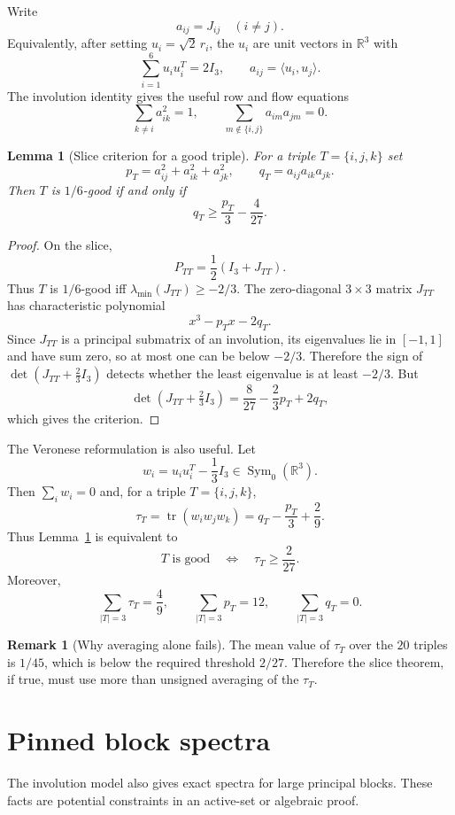 \documentclass[11pt]{article}
\numberwithin{equation}{section}
\newtheorem{lemma}[theorem]{Lemma}
\theoremstyle{definition}
\newtheorem{remark}[theorem]{Remark}
\newcommand{\R}{\mathbb{R}}
\newcommand{\tr}{\operatorname{tr}}
\newcommand{\lmin}{\lambda_{\min}}
\begin{document}
Write
\[
  a_{ij}=J_{ij}\quad (i\ne j).
\]
Equivalently, after setting $u_i=\sqrt2\,r_i$, the $u_i$ are unit vectors in
$\R^3$ with
\[
  \sum_{i=1}^6 u_i u_i^T=2I_3,\qquad a_{ij}=\langle u_i,u_j\rangle.
\]
The involution identity gives the useful row and flow equations
\[
  \sum_{k\ne i}a_{ik}^2=1,\qquad
  \sum_{m\notin\{i,j\}}a_{im}a_{jm}=0.
\]

\begin{lemma}[Slice criterion for a good triple]\label{lem:slicecriterion}
For a triple $T=\{i,j,k\}$ set
\[
  p_T=a_{ij}^2+a_{ik}^2+a_{jk}^2,\qquad q_T=a_{ij}a_{ik}a_{jk}.
\]
Then $T$ is $1/6$-good if and only if
\[
  q_T\ge \frac{p_T}{3}-\frac4{27}.
\]
\end{lemma}

\begin{proof}
On the slice,
\[
  P_{TT}=\frac12(I_3+J_{TT}).
\]
Thus $T$ is $1/6$-good iff $\lmin(J_{TT})\ge-2/3$.  The zero-diagonal
$3\times3$ matrix $J_{TT}$ has characteristic polynomial
\[
  x^3-p_Tx-2q_T.
\]
Since $J_{TT}$ is a principal submatrix of an involution, its eigenvalues lie
in $[-1,1]$ and have sum zero, so at most one can be below $-2/3$.  Therefore
the sign of $\det(J_{TT}+\frac23 I_3)$ detects whether the least eigenvalue is
at least $-2/3$.  But
\[
  \det(J_{TT}+\tfrac23 I_3)=\frac8{27}-\frac23p_T+2q_T,
\]
which gives the criterion.
\end{proof}

The Veronese reformulation is also useful.  Let
\[
  w_i=u_i u_i^T-\frac13I_3\in\operatorname{Sym}_0(\R^3).
\]
Then $\sum_iw_i=0$ and, for a triple $T=\{i,j,k\}$,
\[
  \tau_T=\tr(w_iw_jw_k)=q_T-\frac{p_T}{3}+\frac29.
\]
Thus Lemma~\ref{lem:slicecriterion} is equivalent to
\[
  T\text{ is good}\quad\Longleftrightarrow\quad \tau_T\ge\frac2{27}.
\]
Moreover,
\[
  \sum_{|T|=3}\tau_T=\frac49,\qquad
  \sum_{|T|=3}p_T=12,\qquad
  \sum_{|T|=3}q_T=0.
\]

\begin{remark}[Why averaging alone fails]
The mean value of $\tau_T$ over the $20$ triples is $1/45$, which is below
the required threshold $2/27$.  Therefore the slice theorem, if true, must use
more than unsigned averaging of the $\tau_T$.
\end{remark}

\section{Pinned block spectra}

The involution model also gives exact spectra for large principal blocks.
These facts are potential constraints in an active-set or algebraic proof.
\end{document}
